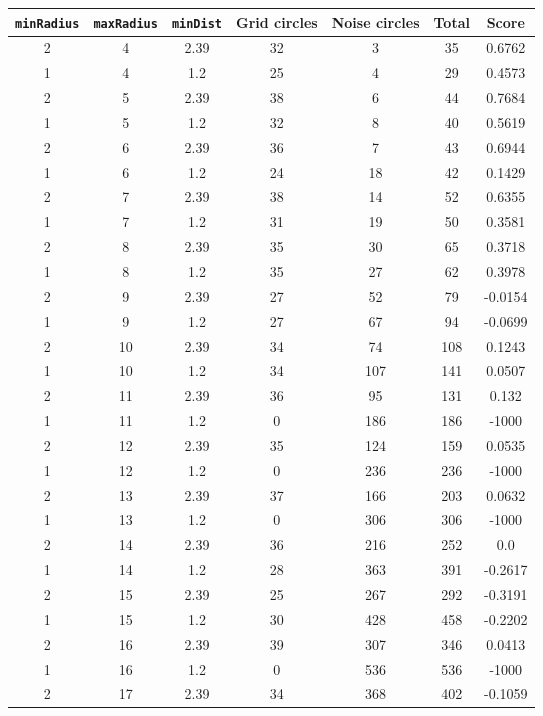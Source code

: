 \documentclass[letterpaper, 12pt]{article}
\begin{document}
\begin{longtable}{|c|c|c|c|c|c|c|}
\hline
\textbf{\texttt{minRadius}} & \textbf{\texttt{maxRadius}} & \textbf{\texttt{minDist}} & \textbf{Grid circles} & \textbf{Noise circles} & \textbf{Total} & \textbf{Score} \\
\hline
2 & 4 & 2.39 & 32 & 3 & 35 & 0.6762 \\
\hline
1 & 4 & 1.2 & 25 & 4 & 29 & 0.4573 \\
\hline
2 & 5 & 2.39 & 38 & 6 & 44 & 0.7684 \\
\hline
1 & 5 & 1.2 & 32 & 8 & 40 & 0.5619 \\
\hline
2 & 6 & 2.39 & 36 & 7 & 43 & 0.6944 \\
\hline
1 & 6 & 1.2 & 24 & 18 & 42 & 0.1429 \\
\hline
2 & 7 & 2.39 & 38 & 14 & 52 & 0.6355 \\
\hline
1 & 7 & 1.2 & 31 & 19 & 50 & 0.3581 \\
\hline
2 & 8 & 2.39 & 35 & 30 & 65 & 0.3718 \\
\hline
1 & 8 & 1.2 & 35 & 27 & 62 & 0.3978 \\
\hline
2 & 9 & 2.39 & 27 & 52 & 79 & -0.0154 \\
\hline
1 & 9 & 1.2 & 27 & 67 & 94 & -0.0699 \\
\hline
2 & 10 & 2.39 & 34 & 74 & 108 & 0.1243 \\
\hline
1 & 10 & 1.2 & 34 & 107 & 141 & 0.0507 \\
\hline
2 & 11 & 2.39 & 36 & 95 & 131 & 0.132 \\
\hline
1 & 11 & 1.2 & 0 & 186 & 186 & -1000 \\
\hline
2 & 12 & 2.39 & 35 & 124 & 159 & 0.0535 \\
\hline
1 & 12 & 1.2 & 0 & 236 & 236 & -1000 \\
\hline
2 & 13 & 2.39 & 37 & 166 & 203 & 0.0632 \\
\hline
1 & 13 & 1.2 & 0 & 306 & 306 & -1000 \\
\hline
2 & 14 & 2.39 & 36 & 216 & 252 & 0.0 \\
\hline
1 & 14 & 1.2 & 28 & 363 & 391 & -0.2617 \\
\hline
2 & 15 & 2.39 & 25 & 267 & 292 & -0.3191 \\
\hline
1 & 15 & 1.2 & 30 & 428 & 458 & -0.2202 \\
\hline
2 & 16 & 2.39 & 39 & 307 & 346 & 0.0413 \\
\hline
1 & 16 & 1.2 & 0 & 536 & 536 & -1000 \\
\hline
2 & 17 & 2.39 & 34 & 368 & 402 & -0.1059 \\

\end{longtable}
\end{document}
